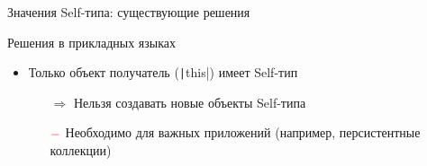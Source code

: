 \documentclass[usenames, dvipsnames]{beamer}
\begin{document}
\begin{frame}[fragile]{Значения Self-типа: существующие решения}
        \begin{block}{Решения в прикладных языках}
            \begin{itemize}
                \item Только объект получатель (\texttt|this|) имеет Self-тип
                \begin{itemize}
                    \item[$\Rightarrow$] Нельзя создавать новые объекты Self-типа
                    \item[$\color{red} -$] Необходимо для важных приложений (например, персистентные коллекции)
                \end{itemize}
            \end{itemize}
        \end{block}
    \end{frame}
\end{document}
